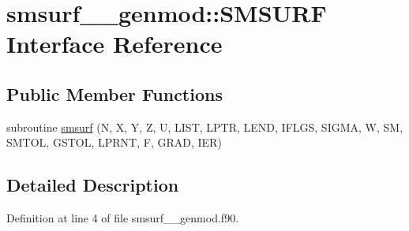 \hypertarget{interfacesmsurf____genmod_1_1SMSURF}{\section{smsurf\+\_\+\+\_\+genmod\+:\+:S\+M\+S\+U\+R\+F Interface Reference}
\label{interfacesmsurf____genmod_1_1SMSURF}
}
\subsection*{Public Member Functions}
\begin{DoxyCompactItemize}
\item 
subroutine \hyperlink{interfacesmsurf____genmod_1_1SMSURF_a0378153c883e33fed81461ec77ff2a72}{smsurf} (N, X, Y, Z, U, L\+I\+S\+T, L\+P\+T\+R, L\+E\+N\+D, I\+F\+L\+G\+S, S\+I\+G\+M\+A, W, S\+M, S\+M\+T\+O\+L, G\+S\+T\+O\+L, L\+P\+R\+N\+T, F, G\+R\+A\+D, I\+E\+R)
\end{DoxyCompactItemize}


\subsection{Detailed Description}


Definition at line 4 of file smsurf\+\_\+\+\_\+genmod.\+f90.



